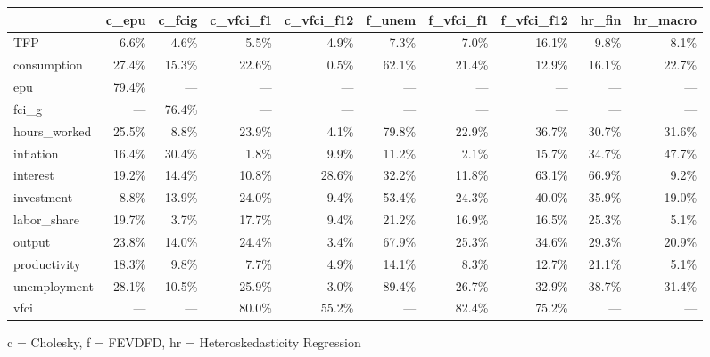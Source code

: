 
\fontsize{12.0pt}{14.4pt}\selectfont
\begin{tabular*}{\linewidth}{@{\extracolsep{\fill}}l|rrrrrrrrr}
\toprule
 & c\_epu & c\_fcig & c\_vfci\_f1 & c\_vfci\_f12 & f\_unem & f\_vfci\_f1 & f\_vfci\_f12 & hr\_fin & hr\_macro \\ 
\midrule\addlinespace[2.5pt]
TFP & 6.6\% & 4.6\% & 5.5\% & 4.9\% & 7.3\% & 7.0\% & 16.1\% & 9.8\% & 8.1\% \\ 
consumption & 27.4\% & 15.3\% & 22.6\% & 0.5\% & 62.1\% & 21.4\% & 12.9\% & 16.1\% & 22.7\% \\ 
epu & 79.4\% & — & — & — & — & — & — & — & — \\ 
fci\_g & — & 76.4\% & — & — & — & — & — & — & — \\ 
hours\_worked & 25.5\% & 8.8\% & 23.9\% & 4.1\% & 79.8\% & 22.9\% & 36.7\% & 30.7\% & 31.6\% \\ 
inflation & 16.4\% & 30.4\% & 1.8\% & 9.9\% & 11.2\% & 2.1\% & 15.7\% & 34.7\% & 47.7\% \\ 
interest & 19.2\% & 14.4\% & 10.8\% & 28.6\% & 32.2\% & 11.8\% & 63.1\% & 66.9\% & 9.2\% \\ 
investment & 8.8\% & 13.9\% & 24.0\% & 9.4\% & 53.4\% & 24.3\% & 40.0\% & 35.9\% & 19.0\% \\ 
labor\_share & 19.7\% & 3.7\% & 17.7\% & 9.4\% & 21.2\% & 16.9\% & 16.5\% & 25.3\% & 5.1\% \\ 
output & 23.8\% & 14.0\% & 24.4\% & 3.4\% & 67.9\% & 25.3\% & 34.6\% & 29.3\% & 20.9\% \\ 
productivity & 18.3\% & 9.8\% & 7.7\% & 4.9\% & 14.1\% & 8.3\% & 12.7\% & 21.1\% & 5.1\% \\ 
unemployment & 28.1\% & 10.5\% & 25.9\% & 3.0\% & 89.4\% & 26.7\% & 32.9\% & 38.7\% & 31.4\% \\ 
vfci & — & — & 80.0\% & 55.2\% & — & 82.4\% & 75.2\% & — & — \\ 
\bottomrule
\end{tabular*}
\begin{minipage}{\linewidth}
c = Cholesky, f = FEVDFD, hr = Heteroskedasticity Regression\\
\end{minipage}


